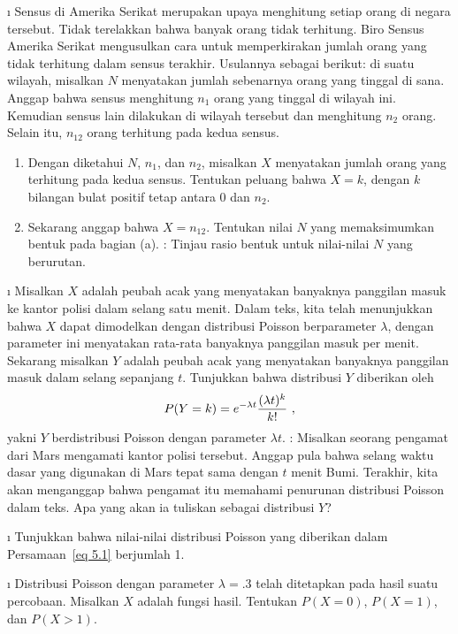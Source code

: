 \begin{LJSItem}
\i\label{exercise 5.1.107} Sensus di Amerika Serikat merupakan upaya menghitung
setiap orang di negara tersebut. Tidak terelakkan bahwa banyak orang tidak terhitung.
Biro Sensus Amerika Serikat mengusulkan cara untuk memperkirakan jumlah orang yang
tidak terhitung dalam sensus terakhir. Usulannya sebagai berikut: di suatu wilayah,
misalkan $N$ menyatakan jumlah sebenarnya orang yang tinggal di sana. Anggap bahwa
sensus menghitung $n_1$ orang yang tinggal di wilayah ini. Kemudian sensus lain
dilakukan di wilayah tersebut dan menghitung $n_2$ orang. Selain itu, $n_{12}$ orang
terhitung pada kedua sensus.  
\begin{enumerate}
\item Dengan diketahui $N$, $n_1$, dan $n_2$, misalkan $X$ menyatakan jumlah orang
yang terhitung pada kedua sensus. Tentukan peluang bahwa $X = k$, dengan $k$ bilangan
bulat positif tetap antara 0 dan $n_2$.
\item Sekarang anggap bahwa $X = n_{12}$. Tentukan nilai $N$ yang memaksimumkan bentuk
pada bagian (a). : Tinjau rasio bentuk untuk nilai-nilai $N$ yang
berurutan.
\end{enumerate}

\i\label{exer 5.1.26} Misalkan $X$ adalah peubah acak yang menyatakan banyaknya
panggilan masuk ke kantor polisi dalam selang satu menit. Dalam teks, kita telah
menunjukkan bahwa $X$ dapat dimodelkan dengan distribusi Poisson berparameter
$\lambda$, dengan parameter ini menyatakan rata-rata banyaknya panggilan masuk per
menit. Sekarang misalkan $Y$ adalah peubah acak yang menyatakan banyaknya panggilan
masuk dalam selang sepanjang $t$. Tunjukkan bahwa distribusi $Y$ diberikan oleh
$$P(Y = k) = e^{-\lambda t}{{(\lambda t)^k}\over{k!}}\ ,$$  yakni $Y$ berdistribusi
Poisson dengan parameter $\lambda t$. : Misalkan seorang pengamat dari Mars
mengamati kantor polisi tersebut. Anggap pula bahwa selang waktu dasar yang digunakan
di Mars tepat sama dengan $t$ menit Bumi. Terakhir, kita akan menganggap bahwa
pengamat itu memahami penurunan distribusi Poisson dalam teks. Apa yang akan ia
tuliskan sebagai distribusi $Y$?

\i\label{exer 5.1.27} Tunjukkan bahwa nilai-nilai distribusi Poisson yang diberikan
dalam Persamaan~\ref{eq 5.1} berjumlah 1.

\i\label{exer 5.1.108} Distribusi Poisson dengan parameter $\lambda = .3$ telah
ditetapkan pada hasil suatu percobaan. Misalkan $X$ adalah fungsi hasil. Tentukan
$P(X = 0)$, $P(X = 1)$, dan $P(X > 1)$.


\end{LJSItem}

